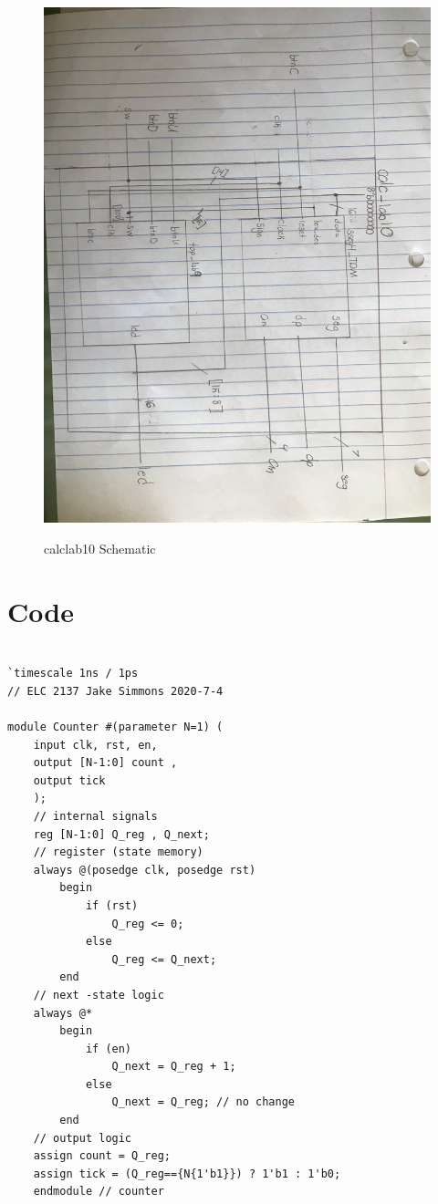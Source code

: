 \documentclass[11pt]{article}
\begin{document}
\begin{figure}[ht]\centering
	\caption{calclab10 Schematic}
	\includegraphics[width=1.15 \textwidth]{calc_lab10_Schematic.jpeg}
	\label{fig:picture}
\end{figure}

\clearpage
\section*{Code}

\begin{lstlisting}[style=Verilog,
caption=Counter Module,
label=counter 
]

`timescale 1ns / 1ps
// ELC 2137 Jake Simmons 2020-7-4

module Counter #(parameter N=1) ( 
	input clk, rst, en, 
	output [N-1:0] count , 
	output tick 
	);
	// internal signals 
	reg [N-1:0] Q_reg , Q_next;
	// register (state memory) 
	always @(posedge clk, posedge rst) 
		begin 
			if (rst) 
				Q_reg <= 0; 
			else 
				Q_reg <= Q_next; 
		end
	// next -state logic 
	always @* 
		begin 
			if (en) 
				Q_next = Q_reg + 1; 
			else 
				Q_next = Q_reg; // no change 
		end
	// output logic 
	assign count = Q_reg; 
	assign tick = (Q_reg=={N{1'b1}}) ? 1'b1 : 1'b0;
	endmodule // counter
\end{lstlisting}
\end{document}
